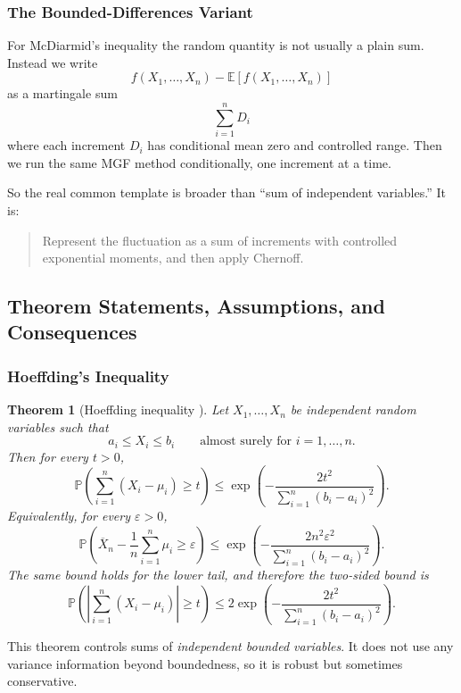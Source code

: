 \documentclass{article}
\newtheorem{theorem}{Theorem}[section]
\theoremstyle{definition}
\theoremstyle{remark}
\newcommand{\EE}{\mathbb{E}}
\newcommand{\PP}{\mathbb{P}}
\begin{document}
\subsubsection{The Bounded-Differences Variant}

For McDiarmid's inequality the random quantity is not usually a plain sum. Instead we write
$$
f(X_1,\dots,X_n)-\EE[f(X_1,\dots,X_n)]
$$
as a martingale sum
$$
\sum_{i=1}^n D_i
$$
where each increment $D_i$ has conditional mean zero and controlled range. Then we run the same MGF method conditionally, one increment at a time.

So the real common template is broader than ``sum of independent variables.'' It is:

\begin{quote}
Represent the fluctuation as a sum of increments with controlled exponential moments, and then apply Chernoff.
\end{quote}

\subsection{Theorem Statements, Assumptions, and Consequences}

\subsubsection{Hoeffding's Inequality}

\begin{theorem}[Hoeffding inequality \cite{Hoeffding1963}]
\label{thm:hoeffding}
Let $X_1,\dots,X_n$ be independent random variables such that
$$
a_i \le X_i \le b_i
\qquad \text{almost surely for } i=1,\dots,n.
$$
Then for every $t>0$,
$$
\PP\!\left(
\sum_{i=1}^n (X_i-\mu_i) \ge t
\right)
\le
\exp\!\left(
-\frac{2t^2}{\sum_{i=1}^n (b_i-a_i)^2}
\right).
$$
Equivalently, for every $\varepsilon > 0$,
$$
\PP\!\left(
\overline{X}_n - \frac{1}{n}\sum_{i=1}^n \mu_i \ge \varepsilon
\right)
\le
\exp\!\left(
-\frac{2n^2\varepsilon^2}{\sum_{i=1}^n (b_i-a_i)^2}
\right).
$$
The same bound holds for the lower tail, and therefore the two-sided bound is
$$
\PP\!\left(
\left|
\sum_{i=1}^n (X_i-\mu_i)
\right| \ge t
\right)
\le
2\exp\!\left(
-\frac{2t^2}{\sum_{i=1}^n (b_i-a_i)^2}
\right).
$$
\end{theorem}

This theorem controls sums of \emph{independent bounded variables}. It does not use any variance information beyond boundedness, so it is robust but sometimes conservative.
\end{document}
